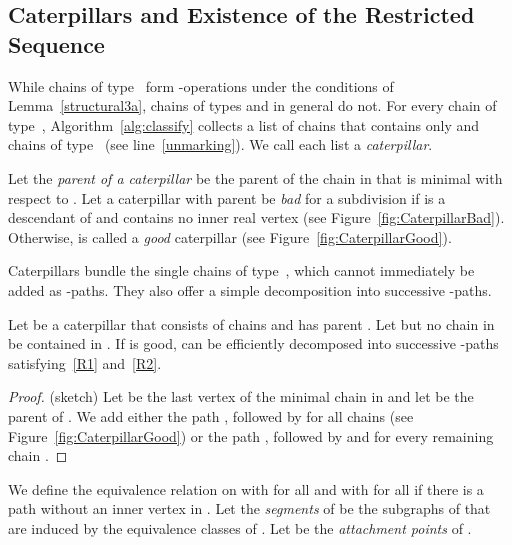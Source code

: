 \subsection{Caterpillars and Existence of the Restricted Sequence}\label{caterpillars}
While chains of type~ form \BG-operations under the conditions of Lemma~\ref{structural3a}, chains of types  and  in general do not. For every chain  of type~, Algorithm~\ref{alg:classify} collects a list  of chains that contains only  and chains of type~ (see line~\ref{unmarking}). We call each list  a \emph{caterpillar}.





\begin{definition}
Let the \emph{parent of a caterpillar}  be the parent of the chain in  that is minimal with respect to .
Let a caterpillar  with parent  be \emph{bad} for a subdivision  if  is a descendant of  and  contains no inner real vertex (see Figure~\ref{fig:CaterpillarBad}). Otherwise,  is called a \emph{good} caterpillar (see Figure~\ref{fig:CaterpillarGood}).
\end{definition}

Caterpillars bundle the single chains of type~, which cannot immediately be added as \BG-paths. They also offer a simple decomposition into successive \BG-paths.

\begin{lemma}\label{AddCaterpillar}
Let  be a caterpillar that consists of  chains and has parent . Let  but no chain in  be contained in . If  is good,  can be efficiently decomposed into  successive \BG-paths satisfying~\ref{R1} and~\ref{R2}.
\end{lemma}
\begin{proof} (sketch) Let  be the last vertex of the minimal chain in  and let  be the parent of . We add either the path , followed by  for all chains  (see Figure~\ref{fig:CaterpillarGood}) or the path , followed by  and  for every remaining chain .
\end{proof}






\begin{definition}\label{segment}
We define the equivalence relation  on  with  for all  and with  for all  if there is a path  without an inner vertex in .
Let the \emph{segments} of  be the subgraphs of  that are induced by the equivalence classes of . Let  be the \emph{attachment points} of .
\end{definition}



